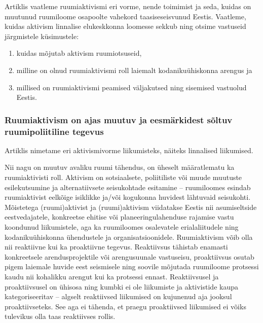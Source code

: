 \documentclass[estonian,]{article}
\providecommand{\tightlist}{%
  \setlength{\itemsep}{0pt}\setlength{\parskip}{0pt}}
\begin{document}
Artiklis vaatleme ruumiaktivismi eri vorme, nende toimimist ja seda, kuidas on muutunud ruumiloome osapoolte vahekord taasiseseisvunud Eestis. Vaatleme, kuidas aktivism linnalise elukeskkonna loomesse sekkub ning otsime vastuseid järgmistele küsimustele:

\begin{enumerate}
\def\labelenumi{\arabic{enumi})}
\tightlist
\item
  kuidas mõjutab aktivism ruumiotsuseid,
\item
  milline on olnud ruumiaktivismi roll laiemalt kodanikuühiskonna arengus ja
\item
  millised on ruumiaktivismi peamised väljakutsed ning sisemised vastuolud Eestis.
\end{enumerate}

\hypertarget{ruumiaktivism-on-ajas-muutuv-ja-eesmuxe4rkidest-suxf5ltuv-ruumipoliitiline-tegevus}{%
\subsubsection*{Ruumiaktivism on ajas muutuv ja eesmärkidest sõltuv ruumipoliitiline tegevus}\label{ruumiaktivism-on-ajas-muutuv-ja-eesmuxe4rkidest-suxf5ltuv-ruumipoliitiline-tegevus}}

\begin{blockquote-right}
Artiklis nimetame eri aktivismivorme liikumisteks, näiteks linnalised
liikumised.
\end{blockquote-right}

Nii nagu on muutuv avaliku ruumi tähendus, on üheselt määratlematu ka ruumiaktivisti roll. Aktivism on sotsiaalsete, poliitiliste või muude muutuste esilekutsumine ja alternatiivsete seisukohtade esitamine -- ruumiloomes esindab ruumiaktivist eelkõige isiklikke ja/või kogukonna huvidest lähtuvaid seisukohti. Mõistetega (ruumi)aktivist ja (ruumi)aktivism viidatakse Eestis nii asumiseltside eestvedajatele, konkreetse ehitise või planeeringulahenduse rajamise vastu koondunud liikumistele, aga ka ruumiloomes osalevatele erialaliitudele ning kodanikuühiskonna ühendustele ja organisatsioonidele. Ruumiaktivism võib olla nii reaktiivne kui ka proaktiivne tegevus. Reaktiivsus tähistab enamasti konkreetsele arendusprojektile või arengusuunale vastuseisu, proaktiivsus osutab pigem laiemale huvide eest seismisele ning soovile mõjutada ruumiloome protsessi kaudu nii kohalikku arengut kui ka protsessi ennast. Reaktiivsusel ja proaktiivsusel on ühisosa ning kumbki ei ole liikumiste ja aktivistide kaupa kategoriseeritav -- algselt reaktiivsed liikumised on kujunenud aja jooksul proaktiivseteks. See aga ei tähenda, et praegu proaktiivsed liikumised ei võiks tulevikus olla taas reaktiivses rollis.
\end{document}
